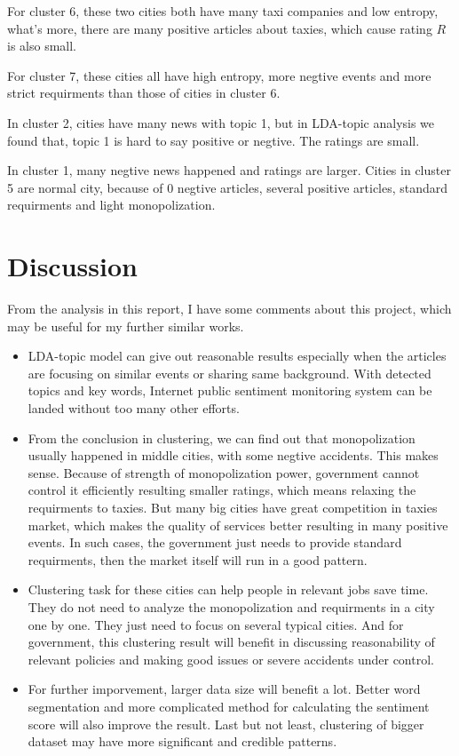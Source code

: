 \documentclass[12pt]{extarticle}
\begin{document}
For cluster 6, these two cities both have many taxi companies and low entropy, what's more, there are many positive articles about taxies, which cause rating $R$ is also small. 

For cluster 7, these cities all have high entropy, more negtive events and more strict requirments than those of cities in cluster 6.
 
In cluster 2, cities have many news with topic 1, but in LDA-topic analysis we found that, topic 1 is hard to say positive or negtive. The ratings are small.

In cluster 1, many negtive news happened and ratings are larger. Cities in cluster 5 are normal city, because of 0 negtive articles, several positive articles, standard requirments and light monopolization.

\section{Discussion}
From the analysis in this report, I have some comments about this project, which may be useful for my further similar works.
\begin{itemize}
	\item LDA-topic model can give out reasonable results especially when the articles are focusing on similar events or sharing same background. With detected topics and key words, Internet public sentiment monitoring system can be landed without too many other efforts.
	\item From the conclusion in clustering, we can find out that monopolization usually happened in middle cities, with some negtive accidents. This makes sense. Because of strength of monopolization power, government cannot control it efficiently resulting smaller ratings, which means relaxing the requirments to taxies. But many big cities have great competition in taxies market, which makes the quality of services better resulting in many positive events. In such cases, the government just needs to provide standard requirments, then the market itself will run in a good pattern.
	\item Clustering task for these cities can help people in relevant jobs save time. They do not need to analyze the monopolization and requirments in a city one by one. They just need to focus on several typical cities. And for government, this clustering result will benefit in discussing reasonability of relevant policies and making  good issues or severe accidents under control. 
	\item For further imporvement, larger data size will benefit a lot. Better word segmentation and more complicated method for calculating the sentiment score will also improve the result. Last but not least, clustering of bigger dataset may have more significant and credible patterns.
\end{itemize}
\end{document}
